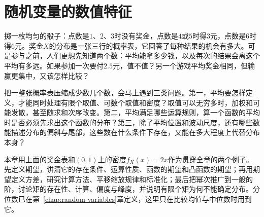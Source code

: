 \chapter{随机变量的数值特征}
\label{chap:random-variable-moments}

掷一枚均匀的骰子：点数是$1$、$2$、$3$时没有奖金，点数是$4$或$5$时得$3$元，点数是$6$时得$6$元。奖金$X$的分布是一张三行的概率表，它回答了每种结果的机会有多大。可是参与之前，人们更想先知道两个数：平均能拿多少钱，以及每次的结果会离这个平均有多远。如果参加一次要付$2.5$元，值不值？另一个游戏平均奖金相同，但输赢更集中，又该怎样比较？

把一整张概率表压缩成少数几个数，会马上遇到三类问题。第一，平均要怎样定义，才能同时处理有限个取值、可数个取值和密度？取值可以无穷多时，加权和可能发散，甚至随求和次序改变。第二，平均满足哪些运算规则，算一个函数的平均时是否必须先求出这个函数的分布？第三，除了平均位置和波动尺度，还有哪些数能描述分布的偏斜与尾部，这些数在什么条件下存在，又能在多大程度上代替分布本身？

本章用上面的奖金表和$(0,1)$上的密度$f_X(x)=2x$作为贯穿全章的两个例子。先定义期望，讲清它的存在条件、运算性质、函数的期望和凸函数的期望；再用期望定义方差，研究计算方法、平移缩放规律和标准化；最后把幂次推广到一般的阶，讨论矩的存在性、计算、偏度与峰度，并说明有限个矩为何不能确定分布。分位数已在第~\ref{chap:random-variables}章定义，这里只在比较均值与中位数时用到它。








